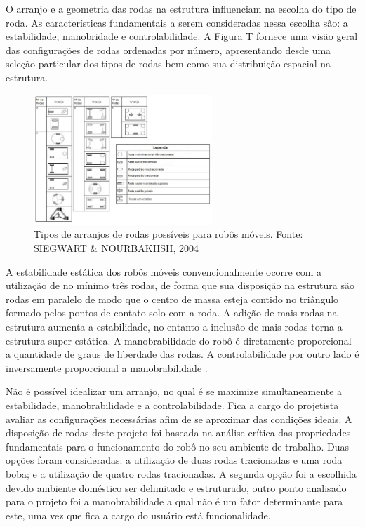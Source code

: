 O arranjo e a geometria das rodas na estrutura influenciam na escolha do tipo de roda. As características fundamentais a serem
consideradas nessa escolha são: a estabilidade, manobridade e controlabilidade. A Figura T fornece uma visão geral das configurações
de rodas ordenadas por número, apresentando desde uma seleção particular dos tipos de rodas bem como sua distribuição espacial na estrutura.

\begin{figure}[H]
    \centering
    \includegraphics[width=0.6\textwidth]{figuras/arranjos_roda.eps}
    \caption{Tipos de arranjos de rodas possíveis para robôs móveis. Fonte: SIEGWART \& NOURBAKHSH, 2004}
    \label{fig:arranjo_roda}
\end{figure}

A estabilidade estática dos robôs móveis convencionalmente ocorre com a utilização de no mínimo três rodas, de forma que sua disposição
na estrutura são rodas em paralelo de modo que o centro de massa esteja contido no triângulo formado pelos pontos de contato solo com a
roda. A adição de mais rodas na estrutura aumenta a estabilidade, no entanto a inclusão de mais rodas torna a estrutura super estática.
A manobrabilidade do robô é diretamente proporcional a quantidade de graus de liberdade das rodas. A controlabilidade por outro lado é
inversamente proporcional a manobrabilidade \cite{braga:2014}.

Não é possível idealizar um arranjo, no qual é se maximize simultaneamente a estabilidade, manobrabilidade e a controlabilidade.
Fica a cargo do projetista avaliar as configurações necessárias afim de se aproximar das condições ideais. A disposição de rodas deste
projeto foi baseada na análise crítica das propriedades fundamentais para o funcionamento do robô no seu ambiente de trabalho. Duas opções
foram consideradas: a utilização de duas rodas tracionadas e uma roda boba; e a utilização de quatro rodas tracionadas. A segunda opção foi
a escolhida devido ambiente doméstico ser delimitado e estruturado, outro ponto analisado para o projeto foi a manobrabilidade a qual não
é um fator determinante para este, uma vez que fica a cargo do usuário está funcionalidade.

